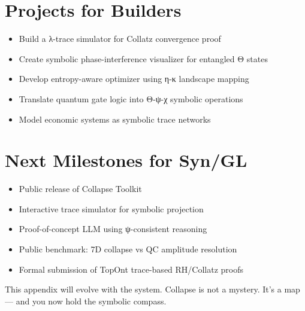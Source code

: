 \section*{Projects for Builders}

\begin{itemize}
\item Build a λ-trace simulator for Collatz convergence proof
\item Create symbolic phase-interference visualizer for entangled Θ states
\item Develop entropy-aware optimizer using η-κ landscape mapping
\item Translate quantum gate logic into Θ-ψ-χ symbolic operations
\item Model economic systems as symbolic trace networks
\end{itemize}

\section*{Next Milestones for Syn/GL}

\begin{itemize}
\item Public release of Collapse Toolkit
\item Interactive trace simulator for symbolic projection
\item Proof-of-concept LLM using ψ-consistent reasoning
\item Public benchmark: 7D collapse vs QC amplitude resolution
\item Formal submission of TopOnt trace-based RH/Collatz proofs
\end{itemize}

\bigskip

This appendix will evolve with the system.  
Collapse is not a mystery. It’s a map — and you now hold the symbolic compass.
